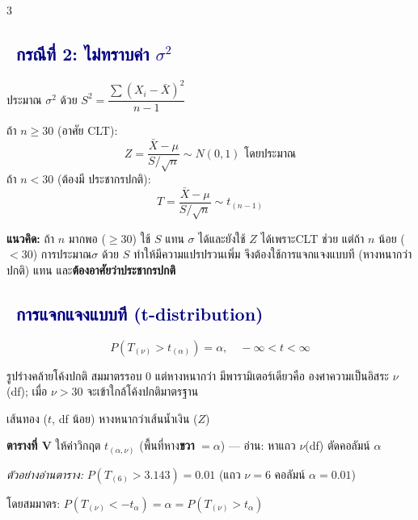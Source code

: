 \documentclass[9pt]{extarticle}
\newcommand{\dist}[1]{\subsection*{\textcolor{navy}{\textbullet\ #1}}}
\begin{document}
\begin{multicols}{3}
\dist{กรณีที่ 2: ไม่ทราบค่า $\sigma^2$}
ประมาณ $\sigma^2$ ด้วย $S^2=\dfrac{\sum(X_i-\bar X)^2}{n-1}$
\begin{formulabox}
ถ้า $n\ge30$ (อาศัย CLT):
$$Z=\dfrac{\bar X-\mu}{S/\sqrt{n}}\sim N(0,1) \text{ โดยประมาณ}$$
ถ้า $n<30$ (ต้องมี ประชากรปกติ):
$$T=\dfrac{\bar X-\mu}{S/\sqrt{n}}\sim t_{(n-1)}$$
\end{formulabox}
\begin{ideabox}
\textbf{แนวคิด:} ถ้า $n$ มากพอ ($\ge30$) ใช้ $S$ แทน $\sigma$ ได้และยัง\allowbreak ใช้ $Z$ ได้เพราะ\allowbreak CLT ช่วย แต่ถ้า $n$ น้อย ($<30$) การประมาณ\allowbreak $\sigma$ ด้วย $S$ ทำให้\allowbreak มีความแปรปรวนเพิ่ม จึงต้องใช้\allowbreak การแจกแจงแบบที (หางหนากว่าปกติ) แทน และ\textbf{ต้องอาศัยว่าประชากรปกติ}
\end{ideabox}

\dist{การแจกแจงแบบที (t-distribution)}
\begin{formulabox}
$$P(T_{(\nu)}>t_{(\alpha)})=\alpha,\quad -\infty<t<\infty$$
\end{formulabox}
รูปร่างคล้ายโค้งปกติ สมมาตรรอบ 0 แต่หางหนากว่า มีพารามิเตอร์เดียวคือ องศาความเป็นอิสระ $\nu$ (df); เมื่อ $\nu>30$ จะเข้าใกล้โค้งปกติมาตรฐาน

\begin{center}
\end{center}
{\footnotesize เส้นทอง ($t$, df น้อย) หางหนากว่าเส้นน้ำเงิน ($Z$)\par}

\textbf{ตารางที่ V} ให้ค่าวิกฤต $t_{(\alpha,\nu)}$ (พื้นที่หาง\textbf{ขวา} $=\alpha$) — อ่าน: หาแถว $\nu$(df) ตัดคอลัมน์ $\alpha$

\textit{ตัวอย่างอ่านตาราง:} $P(T_{(6)}>3.143)=0.01$ (แถว $\nu{=}6$ คอลัมน์ $\alpha{=}0.01$)

โดยสมมาตร: $P(T_{(\nu)}<-t_\alpha)=\alpha=P(T_{(\nu)}>t_\alpha)$


\end{multicols}
\end{document}

